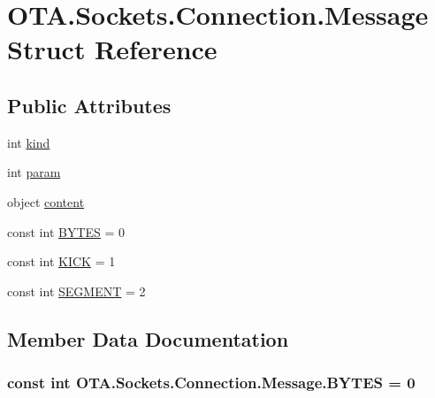\hypertarget{struct_o_t_a_1_1_sockets_1_1_connection_1_1_message}{}\section{O\+T\+A.\+Sockets.\+Connection.\+Message Struct Reference}
\label{struct_o_t_a_1_1_sockets_1_1_connection_1_1_message}
\subsection*{Public Attributes}
\begin{DoxyCompactItemize}
\item 
int \hyperlink{struct_o_t_a_1_1_sockets_1_1_connection_1_1_message_a92167c8bd93ce8bc7265f26fdb7c87d8}{kind}
\item 
int \hyperlink{struct_o_t_a_1_1_sockets_1_1_connection_1_1_message_abfcb936dfc758c4543550c5ea27dc9b1}{param}
\item 
object \hyperlink{struct_o_t_a_1_1_sockets_1_1_connection_1_1_message_afd204f98c507e30b69aab986c498389d}{content}
\item 
const int \hyperlink{struct_o_t_a_1_1_sockets_1_1_connection_1_1_message_a5317de6b3e7732d85a1b48f37bba115f}{B\+Y\+T\+E\+S} = 0
\item 
const int \hyperlink{struct_o_t_a_1_1_sockets_1_1_connection_1_1_message_a41487cb49f232e677244353012ee0ad2}{K\+I\+C\+K} = 1
\item 
const int \hyperlink{struct_o_t_a_1_1_sockets_1_1_connection_1_1_message_af20ae85bb9f636f5a38d0a0dbd66f1fe}{S\+E\+G\+M\+E\+N\+T} = 2
\end{DoxyCompactItemize}


\subsection{Member Data Documentation}
\hypertarget{struct_o_t_a_1_1_sockets_1_1_connection_1_1_message_a5317de6b3e7732d85a1b48f37bba115f}{}
\subsubsection[{B\+Y\+T\+E\+S}]{\setlength{\rightskip}{0pt plus 5cm}const int O\+T\+A.\+Sockets.\+Connection.\+Message.\+B\+Y\+T\+E\+S = 0}\label{struct_o_t_a_1_1_sockets_1_1_connection_1_1_message_a5317de6b3e7732d85a1b48f37bba115f}
\hypertarget{struct_o_t_a_1_1_sockets_1_1_connection_1_1_message_afd204f98c507e30b69aab986c498389d}{}
